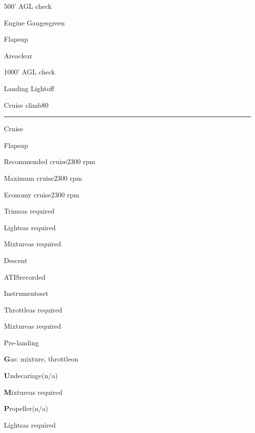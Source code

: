 \pagebreak

\begin{multicols}{2}
\begin{checklist}{500' AGL check}
    \item{Engine Gauges}{green}
    \item{Flaps}{up}
    \item{Area}{clear}
\end{checklist}

\begin{checklist}{1000' AGL check}
    \item{Landing Light}{off}
    \item{Cruise climb}{$80$}
\end{checklist}

\noindent\rule{0.9\linewidth}{0.4pt}
\vspace{0.5em}

\begin{checklist}{Cruise}
    \item{Flaps}{up}
    \item{Recommended cruise}{$2300$ rpm}
    \item{Maximum cruise}{$2300$ rpm}
    \item{Economy cruise}{$2300$ rpm}
    \item{Trims}{as required}
    \item{Lights}{as required}
    \item{Mixture}{as required}
\end{checklist}

\vfill\null
\columnbreak

\begin{checklist}{Descent}
    \item{ATIS}{recorded}
    \item{Instruments}{set}
    \item{Throttle}{as required}
    \item{Mixture}{as required}
\end{checklist}

\begin{checklist}{Pre-landing}
    \item{\textbf{G}as: mixture, throttle}{on}
    \item{\textbf{U}ndecariage}{(n/a)}
    \item{\textbf{M}ixture}{as required}
    \item{\textbf{P}ropeller}{(n/a)}
    \item{Lights}{as required}
\end{checklist}


\end{multicols}
